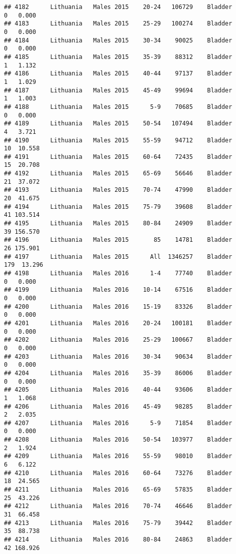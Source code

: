 \documentclass[
]{article}
\begin{document}
\begin{verbatim}
## 4182      Lithuania   Males 2015    20-24   106729    Bladder      0   0.000
## 4183      Lithuania   Males 2015    25-29   100274    Bladder      0   0.000
## 4184      Lithuania   Males 2015    30-34    90025    Bladder      0   0.000
## 4185      Lithuania   Males 2015    35-39    88312    Bladder      1   1.132
## 4186      Lithuania   Males 2015    40-44    97137    Bladder      1   1.029
## 4187      Lithuania   Males 2015    45-49    99694    Bladder      1   1.003
## 4188      Lithuania   Males 2015      5-9    70685    Bladder      0   0.000
## 4189      Lithuania   Males 2015    50-54   107494    Bladder      4   3.721
## 4190      Lithuania   Males 2015    55-59    94712    Bladder     10  10.558
## 4191      Lithuania   Males 2015    60-64    72435    Bladder     15  20.708
## 4192      Lithuania   Males 2015    65-69    56646    Bladder     21  37.072
## 4193      Lithuania   Males 2015    70-74    47990    Bladder     20  41.675
## 4194      Lithuania   Males 2015    75-79    39608    Bladder     41 103.514
## 4195      Lithuania   Males 2015    80-84    24909    Bladder     39 156.570
## 4196      Lithuania   Males 2015       85    14781    Bladder     26 175.901
## 4197      Lithuania   Males 2015      All  1346257    Bladder    179  13.296
## 4198      Lithuania   Males 2016      1-4    77740    Bladder      0   0.000
## 4199      Lithuania   Males 2016    10-14    67516    Bladder      0   0.000
## 4200      Lithuania   Males 2016    15-19    83326    Bladder      0   0.000
## 4201      Lithuania   Males 2016    20-24   100181    Bladder      0   0.000
## 4202      Lithuania   Males 2016    25-29   100667    Bladder      0   0.000
## 4203      Lithuania   Males 2016    30-34    90634    Bladder      0   0.000
## 4204      Lithuania   Males 2016    35-39    86006    Bladder      0   0.000
## 4205      Lithuania   Males 2016    40-44    93606    Bladder      1   1.068
## 4206      Lithuania   Males 2016    45-49    98285    Bladder      2   2.035
## 4207      Lithuania   Males 2016      5-9    71854    Bladder      0   0.000
## 4208      Lithuania   Males 2016    50-54   103977    Bladder      2   1.924
## 4209      Lithuania   Males 2016    55-59    98010    Bladder      6   6.122
## 4210      Lithuania   Males 2016    60-64    73276    Bladder     18  24.565
## 4211      Lithuania   Males 2016    65-69    57835    Bladder     25  43.226
## 4212      Lithuania   Males 2016    70-74    46646    Bladder     31  66.458
## 4213      Lithuania   Males 2016    75-79    39442    Bladder     35  88.738
## 4214      Lithuania   Males 2016    80-84    24863    Bladder     42 168.926

\end{verbatim}
\end{document}
